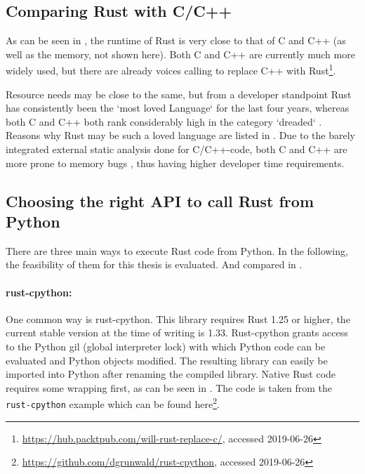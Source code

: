 
\newpage
\subsection{Comparing Rust with C/C++}\label{sec:rustvscc++}

As can be seen in , the runtime of Rust is very close to
that of C and C++ (as well as the memory, not shown here). Both C and C++ are
currently much more widely used, but there are already voices calling to
replace C++ with
Rust\footnote{\url{https://hub.packtpub.com/will-rust-replace-c/}, accessed
2019-06-26}.


Resource needs may be close to the same, but from a developer standpoint Rust
has consistently been the `most loved Language` \cite{rustloved} for the last
four years, whereas both C and C++ both rank considerably high in the category
`dreaded` \cite{rustloved}. Reasons why Rust may be such a loved language are
listed in . Due to the barely integrated external
static analysis done for C/C++-code, both C and C++ are more prone to memory
bugs \cite{pronememory}, thus having higher developer time requirements.





\subsection{Choosing the right API to call Rust from Python}\label{sec:api}

There are three main ways to execute Rust code from Python. In the following,
the feasibility of them for this thesis is evaluated. And compared in
.

\paragraph{rust-cpython:} One common way is rust-cpython. This library requires
Rust 1.25 or higher, the current stable version at the time of writing is 1.33.
Rust-cpython grants access to the Python gil (global interpreter lock) with
which Python code can be evaluated and Python objects modified. The resulting
library can easily be
imported into Python after renaming the compiled library. Native Rust code
requires some wrapping first, as can be seen in . The code is
taken from the \verb|rust-cpython| example which can be found
here\footnote{\url{https://github.com/dgrunwald/rust-cpython}, accessed
2019-06-26}.


